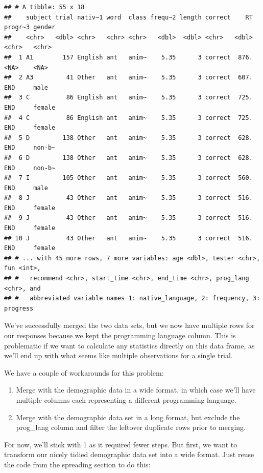 \documentclass[
]{book}
\providecommand{\tightlist}{%
  \setlength{\itemsep}{0pt}\setlength{\parskip}{0pt}}
\begin{document}
\begin{verbatim}
## # A tibble: 55 x 18
##    subject trial nativ~1 word  class frequ~2 length correct    RT progr~3 gender
##    <chr>   <dbl> <chr>   <chr> <chr>   <dbl>  <dbl> <chr>   <dbl> <chr>   <chr> 
##  1 A1        157 English ant   anim~    5.35      3 correct  876. <NA>    <NA>  
##  2 A3         41 Other   ant   anim~    5.35      3 correct  607. END     male  
##  3 C          86 English ant   anim~    5.35      3 correct  725. END     female
##  4 C          86 English ant   anim~    5.35      3 correct  725. END     female
##  5 D         138 Other   ant   anim~    5.35      3 correct  628. END     non-b~
##  6 D         138 Other   ant   anim~    5.35      3 correct  628. END     non-b~
##  7 I         105 Other   ant   anim~    5.35      3 correct  560. END     male  
##  8 J          43 Other   ant   anim~    5.35      3 correct  516. END     female
##  9 J          43 Other   ant   anim~    5.35      3 correct  516. END     female
## 10 J          43 Other   ant   anim~    5.35      3 correct  516. END     female
## # ... with 45 more rows, 7 more variables: age <dbl>, tester <chr>, fun <int>,
## #   recommend <chr>, start_time <chr>, end_time <chr>, prog_lang <chr>, and
## #   abbreviated variable names 1: native_language, 2: frequency, 3: progress
\end{verbatim}

We've successfully merged the two data sets, but we now have multiple rows for our responses because we kept the programming language column. This is problematic if we want to calculate any statistics directly on this data frame, as we'll end up with what seems like multiple observations for a single trial.

We have a couple of workarounds for this problem:

\begin{enumerate}
\def\labelenumi{\arabic{enumi}.}
\tightlist
\item
  Merge with the demographic data in a wide format, in which case we'll have multiple columns each representing a different programming language.
\item
  Merge with the demographic data set in a long format, but exclude the prog\_lang column and filter the leftover duplicate rows prior to merging.
\end{enumerate}

For now, we'll stick with 1 as it required fewer steps. But first, we want to transform our nicely tidied demographic data set into a wide format. Just reuse the code from the spreading section to do this:
\end{document}

